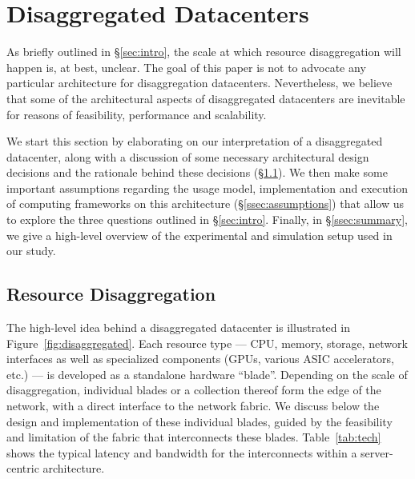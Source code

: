 \section{Disaggregated Datacenters}
\label{sec:summary}
As briefly outlined in \S\ref{sec:intro}, the scale at which resource disaggregation will happen is, at best, unclear. The goal of this paper is not to advocate any particular architecture for disaggregation datacenters. Nevertheless, we believe that some of the architectural aspects of disaggregated datacenters are inevitable for reasons of feasibility, performance and scalability. 

We start this section by elaborating on our interpretation of a disaggregated datacenter, along with a discussion of some necessary architectural design decisions and the rationale behind these decisions (\S\ref{ssec:arch}). We then make some important assumptions regarding the usage model, implementation and execution of computing frameworks on this architecture (\S\ref{ssec:assumptions}) that allow us to explore the three questions outlined in \S\ref{sec:intro}. Finally, in \S\ref{ssec:summary}, we give a high-level overview of the experimental and simulation setup used in our study.

\subsection{Resource Disaggregation}
\label{ssec:arch}
The high-level idea behind a disaggregated datacenter is illustrated in Figure~\ref{fig:disaggregated}. Each resource type --- CPU, memory, storage, network interfaces as well as specialized components (GPUs, various ASIC accelerators, etc.) --- is developed as a standalone hardware ``blade''. Depending on the scale of disaggregation, individual blades or a collection thereof form the edge of the network, with a direct interface to the network fabric. We discuss below the design and implementation of these individual blades, guided by the feasibility and limitation of the fabric that interconnects these blades. Table~\ref{tab:tech} shows the typical latency and bandwidth for the interconnects within a server-centric architecture. 

